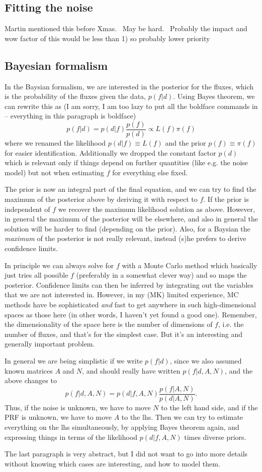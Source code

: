 \documentclass{article}
\begin{document}
\subsection{Fitting the noise}
	Martin mentioned this before Xmas.  May be hard.  Probably the impact and wow factor of this would be less than 1) so probably lower priority
	
\subsection{Bayesian formalism}

In the Baysian formalism, we are interested in the posterior for the fluxes, which
is the probability of the fluxes given the data, $p(f|d)$. Using Bayes theorem, we
can rewrite this as (I am sorry, I am too lazy to put all the boldface commands in --
everything in this paragraph is boldface)
\[
p(f|d) = p(d|f) \frac{p(f)}{p(d)} \propto L(f) \pi(f)
\]
where we renamed the likelihood $p(d|f) \equiv L(f)$ and the prior $p(f)\equiv \pi(f)$
for easier identification. Additionally we dropped the constant factor $p(d)$ which is
relevant only if things depend on further quantities (like e.g. the noise model) but not
when estimating $f$ for everything else fixed.

The prior is now an integral part of the final equation, and we can try to find the
maximum of the posterior above by deriving it with respect to $f$. If the prior is
independent of $f$ we recover the maximum likelihood solution as above. However, in
general the maximum of the posterior will be elsewhere, and also in general the
solution will be harder to find (depending on the prior). Also, for a Baysian the
{\em maximum} of the posterior is not really relevant, instead (s)he prefers to
derive confidence limits.

In principle we can always solve for $f$ with a Monte Carlo method which basically
just tries all possible $f$ (preferably in a somewhat clever way) and so maps
the posterior. Confidence limits can then be inferred by integrating out the variables
that we are not interested in. However, in my (MK) limited experience, MC methods
have be sophisticated {\em and} fast to get anywhere in such high-dimensional spaces
as those here (in other words, I haven't yet found a good one). Remember, the dimensionality
of the space here is the number of dimensions of $f$, i.e. the number of fluxes, 
and that's for the simplest case. But it's an interesting and generally important problem.

In general we are being simplistic if we write $p(f|d)$, since we also assumed known
matrices $A$ and $N$, and should really have written $p(f|d,A,N)$, and the above
changes to
\[
p(f|d,A,N) = p(d|f,A,N) \frac{p(f|A,N)}{p(d|A,N)} .
\]
Thus, if the noise is unknown, we have to move $N$ to the left hand side, and if
the PRF is unknown, we have to move $A$ to the lhs. Then we can try to estimate
everything on the lhs simultaneously, by applying Bayes theorem again, and expressing
things in terms of the likelihood $p(d|f,A,N)$ times diverse priors.

The last paragraph is very abstract, but I did not want to go into more details
without knowing which cases are interesting, and how to model them.
\end{document}
